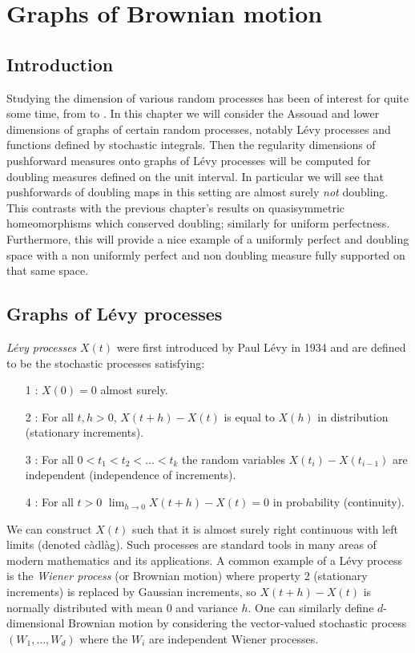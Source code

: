 \chapter{Graphs of Brownian motion}
\label{chap:graphs}

\section{Introduction}
\label{sec:intro-brownian}


Studying the dimension of various random processes has been of interest for quite some time, from \cite{taylor} to \cite{falconer-levy}. In this chapter we will consider the Assouad and lower dimensions of graphs of certain random processes, notably L\'evy processes and functions defined by stochastic integrals. Then the regularity dimensions of pushforward measures onto graphs of L\'evy processes will be computed for doubling measures defined on the unit interval. In particular we will see that pushforwards of doubling maps in this setting are almost surely \textit{not} doubling. This contrasts with the previous chapter's results on quasisymmetric homeomorphisms which conserved doubling; similarly for uniform perfectness. Furthermore, this will provide a nice example of a uniformly perfect and doubling space with a non uniformly perfect and non doubling measure fully supported on that same space.


\section{Graphs of L\'evy processes}
\label{sec:levy-process}


\emph{L\'{e}vy processes} $X(t)$ were first introduced by Paul L\'evy in 1934 \cite{levy} and are defined to be the stochastic processes satisfying:
\begin{itemize}
	\item[1]: $X(0)=0$ almost surely.
	\item[2]: For all $t,h>0$, $X(t+h)-X(t)$ is equal to $X(h)$ in distribution (stationary increments).
	\item[3]: For all $0<t_1<t_2<...<t_k$ the random variables $X(t_i)-X(t_{i-1})$ are independent (independence of increments).
	\item[4]: For all $t>0$ $\lim_{h\to 0} X(t+h)-X(t)=0$ in probability (continuity).
\end{itemize}

We can construct $X(t)$ such that it is almost surely right continuous with left limits (denoted c\`adl\`ag). Such processes are standard tools in many areas of modern mathematics and its applications. A common example of a L\'evy process is the \emph{Wiener process} (or Brownian motion) where property 2 (stationary increments) is replaced by Gaussian increments, so $X(t+h)-X(t)$ is normally distributed with mean 0 and variance $h$. One can similarly define $d$-dimensional Brownian motion by considering the vector-valued stochastic process $(W_1,\ldots, W_d)$ where the $W_i$ are independent Wiener processes. 


